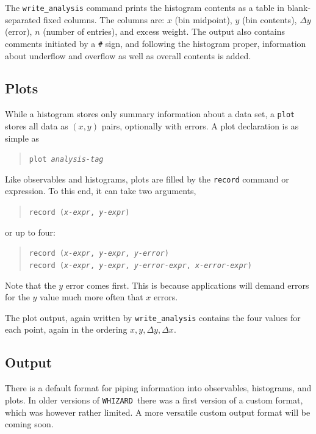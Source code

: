 \documentclass[12pt]{book}
\newcommand{\ttt}[1]{\texttt{#1}}
\newcommand{\whizard}{\texttt{WHIZARD}}
\begin{document}
The \ttt{write\_analysis} command prints the histogram contents as a table in
blank-separated fixed columns.  The columns are: $x$ (bin midpoint), $y$ (bin
contents), $\Delta y$ (error), $n$ (number of entries), and excess weight.
The output also contains comments initiated by a \verb|#| sign, and following
the histogram proper, information about underflow and overflow as well as
overall contents is added.


\subsection{Plots}
\label{sec:plot}

While a histogram stores only summary information about a data set, a
\ttt{plot} stores all data as $(x,y)$ pairs, optionally with errors.  A plot
declaration is as simple as
\begin{quote}
  \begin{footnotesize}
\ttt{plot \emph{analysis-tag}}
  \end{footnotesize}
\end{quote}
Like observables and histograms, plots are filled by the \ttt{record} command
or expression.  To this end, it can take two arguments,
\begin{quote}
  \begin{footnotesize}
\ttt{record (\emph{x-expr}, \emph{y-expr})}
  \end{footnotesize}
\end{quote}
or up to four:
\begin{quote}
  \begin{footnotesize}
\ttt{record (\emph{x-expr}, \emph{y-expr}, \emph{y-error})}
\\
\ttt{record (\emph{x-expr}, \emph{y-expr}, 
  \emph{y-error-expr}, \emph{x-error-expr})}
  \end{footnotesize}
\end{quote}
Note that the $y$ error comes first.  This is because applications will
demand errors for the $y$ value much more often that $x$ errors.

The plot output, again written by \ttt{write\_analysis} contains the four
values for each point, again in the ordering $x,y,\Delta y, \Delta x$.


\subsection{Output}

There is a default format for piping information into observables,
histograms, and plots. In older versions of \whizard\ there was a
first version of a custom format, which was however rather limited.
A more versatile custom output format will be coming soon. 
\end{document}
